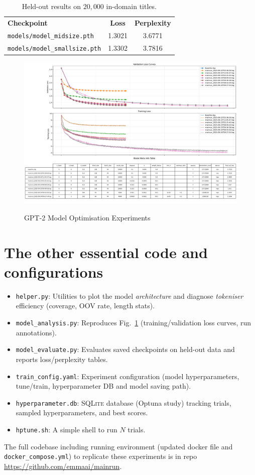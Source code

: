 \documentclass[12pt]{article}
\begin{document}
\begin{table}[h]
\centering
\label{tab:heldout_eval}
\caption{Held-out results on $20{,}000$ in-domain titles.}
\begin{tabular}{lcc}
\textbf{Checkpoint} & \textbf{Loss} & \textbf{Perplexity} \\
\texttt{models/model\_midsize.pth}  & 1.3021 & 3.6771 \\
\texttt{models/model\_smallsize.pth} & 1.3302 & 3.7816 \\
\end{tabular}
\end{table}

\begin{landscape}
\begin{figure}[ht!]
	\caption{GPT-2 Model Optimisation Experiments}
	\centering
	\includegraphics[scale=.6]{model_plot.pdf}
	\label{fig:model_results}
\end{figure}
\end{landscape}

\section{The other essential code and configurations}


\begin{itemize}
  \item \texttt{helper.py}: Utilities to plot the model \emph{architecture} and diagnose \emph{tokeniser} efficiency (coverage, OOV rate, length stats).
  \item \texttt{model\_analysis.py}: Reproduces Fig.~\ref{fig:model_results} (training/validation loss curves, run annotations).
  \item \texttt{model\_evaluate.py}: Evaluates saved checkpoints on held-out data and reports loss/perplexity tables.
  \item \texttt{train\_config.yaml}: Experiment configuration (model hyperparameters, tune/train, hyperparameter DB and model saving path).
  \item \texttt{hyperparameter.db}: \textsc{SQLite} database (Optuna study) tracking trials, sampled hyperparameters, and best scores.
  \item \texttt{hptune.sh}: A simple shell to run $N$ trials.
\end{itemize}

The full codebase including running environment (updated docker file and \texttt{docker\_compose.yml}) to replicate these experiments is in repo \url{https://github.com/emmaai/mainrun}.



\end{document}
